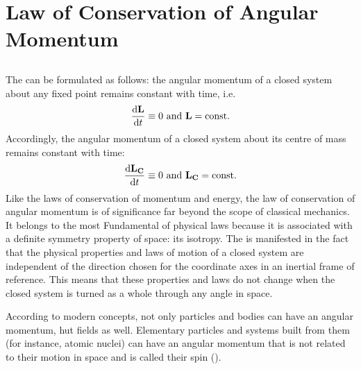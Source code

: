 \section{Law of Conservation of Angular Momentum}
\label{sec-4.4}

\subsection{}\label{4.4.1} The  can be formulated as follows: the angular momentum of a closed system  about any fixed point remains constant with time, i.e.
\begin{equation*}%
\dv{\vb{L}}{t} \equiv 0 \,\, \textrm{and} \,\, \vb{L} = \textrm{const}.
\end{equation*}
Accordingly, the angular momentum of a closed system about its centre of mass  remains constant with time:
\begin{equation*}%
\dv{\vb{L_{C}}}{t} \equiv 0 \,\, \textrm{and} \,\, \vb{L_{C}} = \textrm{const}.
\end{equation*}
Like the laws of conservation of momentum and energy, the law of conservation of angular momentum is of significance far beyond the scope of classical mechanics. It belongs to the most Fundamental of physical laws because it is associated with a definite symmetry property of space: its isotropy. The  is manifested in the fact that the physical properties and laws of motion of a closed system are independent of the direction chosen for the coordinate axes in an inertial frame of reference. This means that these properties and laws do not change when the closed system is turned as a whole through any angle in space.

According to modern concepts, not only particles and bodies can have an angular momentum, hut fields as well. Elementary particles and systems built from them (for instance, atomic nuclei) can have an angular momentum that is not related to their motion in space and is called their spin (). 

